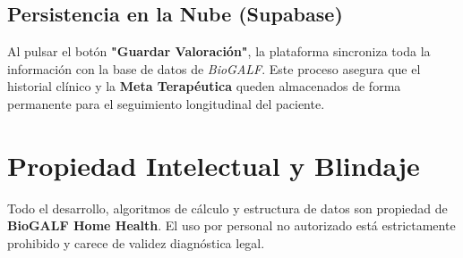 \documentclass[12pt,a4paper]{article}
\begin{document}
\subsection{Persistencia en la Nube (Supabase)}
Al pulsar el botón \textbf{"Guardar Valoración"}, la plataforma sincroniza toda la información con la base de datos de \textit{BioGALF}. Este proceso asegura que el historial clínico y la \textbf{Meta Terapéutica} queden almacenados de forma permanente para el seguimiento longitudinal del paciente.

\section{Propiedad Intelectual y Blindaje}
Todo el desarrollo, algoritmos de cálculo y estructura de datos son propiedad de \textbf{BioGALF Home Health}. El uso por personal no autorizado está estrictamente prohibido y carece de validez diagnóstica legal.
\end{document}
